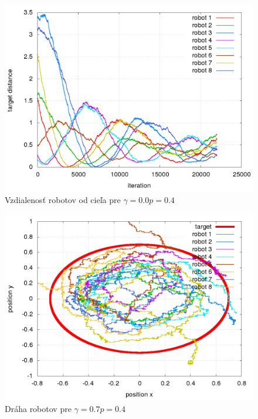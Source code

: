 \begin{figure}[!htb]
\centering
\includegraphics[scale=.4]{../../results_q_learning/nano_q_learning/result_04_01/robot_reward.png}
\caption{Vzdialenosť robotov od cieľa pre $\gamma = 0.0 p = 0.4$}
\label{img:nano_q_result_04_1_error}
\end{figure}




\begin{figure}[!htb]
\centering
\includegraphics[scale=.4]{../../results_q_learning/nano_q_learning/result_04_02/robot_path.png}
\caption{Dráha robotov pre $\gamma = 0.7 p = 0.4$}
\label{img:nano_q_result_04_2_path}
\end{figure}


